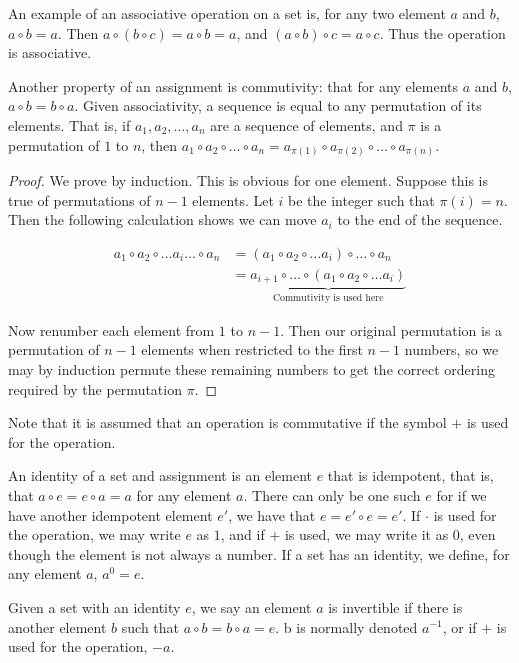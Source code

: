 \documentclass{report}
\begin{document}
An example of an associative operation on a set is, for any two element $a$ and $b$, $a \circ b = a$. Then $a \circ (b \circ c) = a \circ b = a$, and $(a \circ b) \circ c = a \circ c$. Thus the operation is associative.

Another property of an assignment is commutivity: that for any elements $a$ and $b$, $a \circ b = b \circ a$. Given associativity, a sequence is equal to any permutation of its elements. That is, if $a_1, a_2, \dots, a_n$ are a sequence of elements, and $\pi$ is a permutation of $1$ to $n$, then $a_1\circ a_2 \circ \dots \circ a_n = a_{\pi(1)} \circ a_{\pi(2)} \circ \dots \circ a_{\pi(n)}$.
\begin{proof}
    We prove by induction. This is obvious for one element. Suppose this is true of permutations of $n-1$ elements. Let $i$ be the integer such that $\pi(i) = n$. Then the following calculation shows we can move $a_i$ to the end of the sequence.

    \begin{align*}
    a_1 \circ a_2 \circ \dots a_i \dots \circ a_n &= (a_1 \circ a_2 \circ \dots a_i) \circ \dots \circ a_n\\
    &= \underbrace{a_{i+1} \circ \dots \circ (a_1 \circ a_2 \circ \dots a_i)}_\text{Commutivity is used here}
    \end{align*}

    Now renumber each element from $1$ to $n-1$. Then our original permutation is a permutation of $n-1$ elements when restricted to the first $n-1$ numbers, so we may by induction permute these remaining numbers to get the correct ordering required by the permutation $\pi$.
\end{proof}

Note that it is assumed that an operation is commutative if the symbol $+$ is used for the operation.

An identity of a set and assignment is an element $e$ that is idempotent, that is, that $a \circ e = e \circ a = a$ for any element $a$. There can only be one such $e$ for if we have another idempotent element $e'$, we have that $e = e' \circ e = e'$. If $\cdotp$ is used for the operation, we may write $e$ as $1$, and if $+$ is used, we may write it as $0$, even though the element is not always a number. If a set has an identity, we define, for any element $a$, $a^0 = e$.

Given a set with an identity $e$, we say an element $a$ is invertible if there is another element $b$ such that $a \circ b = b \circ a = e$. b is normally denoted $a^{-1}$, or if $+$ is used for the operation, $-a$.
\end{document}
